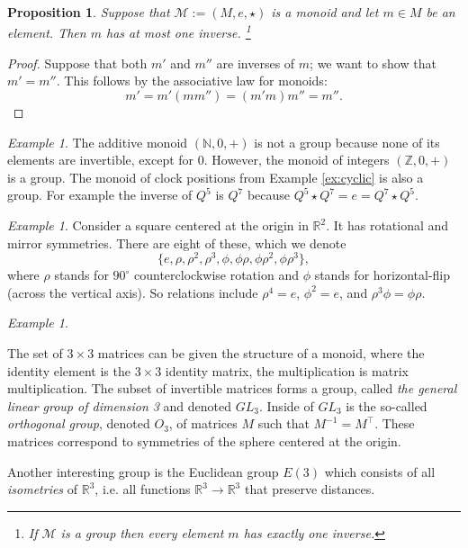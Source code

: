 \documentclass{book}
\def\mc{\mathcal}
\def\ZZ{{\mathbb Z}}
\def\RR{{\mathbb R}}
\def\NN{{\mathbb N}}
\def\to{\rightarrow}
\def\m1{{-1}}
\def\mcM{\mc{M}}
\newtheorem{proposition}[subsubsection]{Proposition}
\theoremstyle{remark}
\newtheorem{example}[subsubsection]{Example}
\theoremstyle{definition}
\begin{document}
\begin{proposition}

Suppose that $\mcM:=(M,e,\star)$ is a monoid and let $m\in M$ be an element. Then $m$ has at most one inverse.
\footnote{If $\mcM$ is a group then every element $m$ has exactly one inverse.}

\end{proposition}

\begin{proof}

Suppose that both $m'$ and $m''$ are inverses of $m$; we want to show that $m'=m''$. This follows by the associative law for monoids:
$$m'=m'(mm'')=(m'm)m''=m''.$$

\end{proof}

\begin{example}

The additive monoid $(\NN,0,+)$ is not a group because none of its elements are invertible, except for $0$. However, the monoid of integers $(\ZZ,0,+)$ is a group. The monoid of clock positions from Example \ref{ex:cyclic} is also a group. For example the inverse of $Q^5$ is $Q^7$ because $Q^5\star Q^7=e=Q^7\star Q^5$.

\end{example}

\begin{example}

Consider a square centered at the origin in $\RR^2$. It has rotational and mirror symmetries. There are eight of these, which we denote $$\{e,\rho,\rho^2,\rho^3,\phi,\phi\rho,\phi\rho^2,\phi\rho^3\},$$ where $\rho$ stands for $90^\circ$ counterclockwise rotation and $\phi$ stands for horizontal-flip (across the vertical axis). So relations include $\rho^4=e$, $\phi^2=e$, and $\rho^3\phi=\phi\rho$.

\end{example}

\begin{example}\label{ex:important groups}

The set of $3\times 3$ matrices can be given the structure of a monoid, where the identity element is the $3\times 3$ identity matrix, the multiplication is matrix multiplication. The subset of invertible matrices forms a group, called {\em the general linear group of dimension 3} and denoted $GL_3$. Inside of $GL_3$ is the so-called {\em orthogonal group}, denoted $O_3$, of matrices $M$ such that $M^\m1=M^\top$. These matrices correspond to symmetries of the sphere centered at the origin.

Another interesting group is the Euclidean group $E(3)$ which consists of all {\em isometries} of $\RR^3$, i.e. all functions $\RR^3\to\RR^3$ that preserve distances.  

\end{example}
\end{document}
